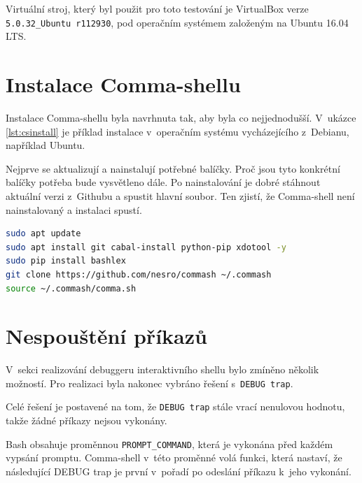 \documentclass[thesis=M,czech]{FITthesis}[2012/06/26]
\begin{document}
Virtuální stroj, který byl použit pro toto testování je VirtualBox verze \texttt{5.0.32\_Ubuntu r112930}, pod operačním systémem založeným na Ubuntu 16.04 LTS.




\section{Instalace Comma-shellu}

Instalace Comma-shellu byla navrhnuta tak, aby byla co nejjednodušší. V~uká\-zce \ref{lst:csinstall} je příklad instalace v~operačním systému vycházejícího z~Debianu, například Ubuntu.

Nejprve se aktualizují a nainstalují potřebné balíčky. Proč jsou tyto konkrétní balíčky potřeba bude vysvětleno dále. Po nainstalování je dobré stáhnout aktuální verzi z~Githubu a spustit hlavní soubor. Ten zjistí, že Comma-shell není nainstalovaný a instalaci spustí.

\noindent
\begin{minipage}{\linewidth}
\begin{lstlisting}[language=bash, caption={Instalace Comma-shellu}, label={lst:csinstall}]
sudo apt update
sudo apt install git cabal-install python-pip xdotool -y
sudo pip install bashlex
git clone https://github.com/nesro/commash ~/.commash
source ~/.commash/comma.sh
\end{lstlisting}
\end{minipage}



%
%
%
%
%
\section{Nespouštění příkazů}\label{sec:debugtraprealization}
V~sekci realizování debuggeru interaktivního shellu bylo zmíněno několik možností. Pro realizaci byla nakonec vybráno řešení s~\texttt{DEBUG trap}.

Celé řešení je postavené na tom, že \texttt{DEBUG trap} stále vrací nenulovou hodnotu, takže žádné příkazy nejsou vykonány.

Bash obsahuje proměnnou \texttt{PROMPT\_COMMAND}, která je vykonána před každém vypsání promptu. Comma-shell v~této proměnné volá funkci, která nastaví, že následující DEBUG trap je první v~pořadí po odeslání příkazu k~jeho vykonání.
\end{document}
